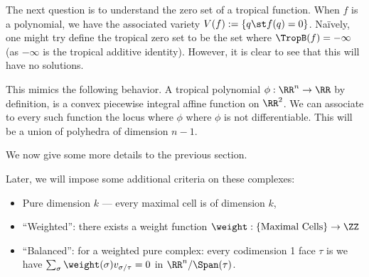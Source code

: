 

The next question is to understand the zero set of a tropical function.  When $f$ is a polynomial, we have the associated variety $V(f):= \{q\st f(q)=0\}$. Na\"ively, one might try define the tropical zero set to be the set where $\TropB(f)=-\infty$ (as $-\infty$ is the tropical additive identity). However, it is clear to see that this will have no solutions. 

This mimics the following behavior. A tropical polynomial $\phi: \RR^n\to \RR$ by definition, is a convex piecewise integral affine function on $\RR^2$. We can associate to every such function the locus where $\phi$ where $\phi$ is not differentiable. This will be a union of polyhedra of dimension $n-1$.




We now give some more details to the previous section. 






Later, we will impose some additional criteria on these complexes:
\begin{itemize}
    \item Pure dimension $k$ --- every maximal cell is of dimension $k$,
    \item ``Weighted'': there exists a weight function $\weight: \{\text{Maximal Cells}\} \to \ZZ$
    \item ``Balanced'': for a weighted pure complex: every codimension 1 face $\tau$ is we have $\sum_{\sigma} \weight(\sigma) v_{\sigma/\tau}=0$ in $\RR^n /\Span(\tau)$.
\end{itemize}

